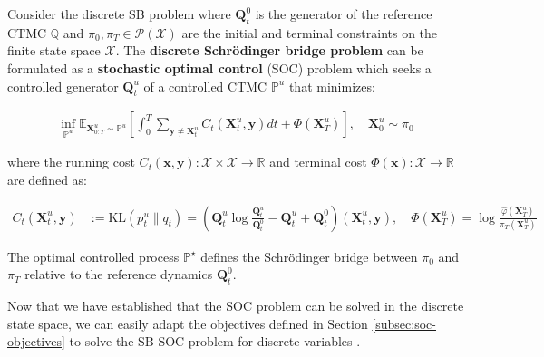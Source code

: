 \documentclass{article}
\begin{document}
\begin{definition}\label{def:discrete-sb-soc}
    Consider the discrete SB problem where $\boldsymbol{Q}^0_t$ is the generator of the reference CTMC $\mathbb{Q}$ and $\pi_0, \pi_T\in \mathcal{P}(\mathcal{X})$ are the initial and terminal constraints on the finite state space $\mathcal{X}$. The \textbf{discrete Schrödinger bridge problem} can be formulated as a \textbf{stochastic optimal control} (SOC) problem which seeks a controlled generator $\boldsymbol{Q}^u_t$ of a controlled CTMC $\mathbb{P}^u$ that minimizes:
    \begin{small}
    \begin{align}
        \inf_{\mathbb{P}^u}\mathbb{E}_{\boldsymbol{X}^u_{0:T}\sim \mathbb{P}^u}\left[\int_0^T\sum_{\boldsymbol{y}\neq \boldsymbol{X}^u_t}C_t(\boldsymbol{X}^u_t,\boldsymbol{y})dt +\Phi(\boldsymbol{X}^u_T)\right], \quad \boldsymbol{X}^u_0\sim \pi_0\tag{Discrete SB-SOC Objective}\label{eq:discrete-sb-soc-loss}
    \end{align}
    \end{small}
    where the running cost $C_t(\boldsymbol{x},\boldsymbol{y}):\mathcal{X}\times \mathcal{X}\to \mathbb{R}$ and terminal cost $\Phi(\boldsymbol{x}):\mathcal{X}\to \mathbb{R}$ are defined as:
    \begin{small}
    \begin{align}
        C_t(\boldsymbol{X}^u_t,\boldsymbol{y})&:=\text{KL}(p^u_t\|q_t)=\left(\boldsymbol{Q}_t^u\log \frac{\boldsymbol{Q}_t^u}{\boldsymbol{Q}_t^0}-\boldsymbol{Q}_t^u+\boldsymbol{Q}^0_t\right)(\boldsymbol{X}^u_t,\boldsymbol{y}), \quad \Phi(\boldsymbol{X}^u_T)=\log \frac{\hat\varphi(\boldsymbol{X}^u_T)}{\pi_T(\boldsymbol{X}^u_T)}
    \end{align}
    \end{small}
    The optimal controlled process $\mathbb{P}^\star$ defines the Schrödinger bridge between $\pi_0$ and $\pi_T$ relative to the reference dynamics $\boldsymbol{Q}_t^0$.
\end{definition}

Now that we have established that the SOC problem can be solved in the discrete state space, we can easily adapt the objectives defined in Section \ref{subsec:soc-objectives} to solve the SB-SOC problem for discrete variables \citep{nusken2021solving, zhu2025mdns}.
\end{document}
